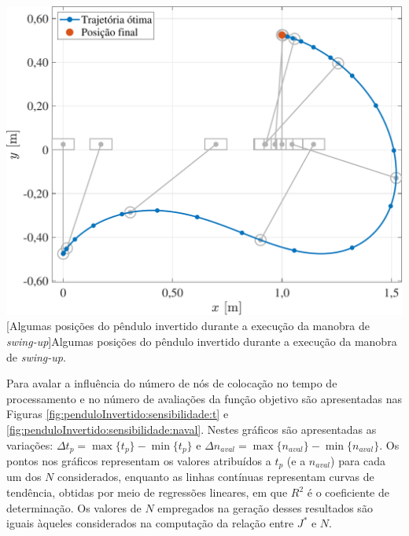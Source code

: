 \noindent
\begin{minipage}{\textwidth}
	\vspace{\onelineskip}
	\centering
	\includegraphics[scale=0.5]{fig/resultados/penduloInvertido/obs/adv}
	[Algumas posições do pêndulo invertido durante a execução da manobra de \textit{swing-up}]{Algumas posições do pêndulo invertido durante a execução da manobra de \textit{swing-up}.}
	\label{fig:penduloInvertido:avancado}
	\vspace{\onelineskip}
\end{minipage}


Para avalar a influência do número de nós de colocação no tempo de processamento e no número de avaliações da função objetivo são apresentadas nas Figuras \ref{fig:penduloInvertido:sensibilidade:t} e \ref{fig:penduloInvertido:sensibilidade:naval}. Nestes gráficos são apresentadas as variações: $ \Delta t_p = \max\{t_p\} - \min\{t_p\} $ e $ \Delta n_{aval} = \max\{n_{aval}\} - \min\{n_{aval}\} $. Os pontos nos gráficos representam os valores atribuídos a $ t_p $ (e a $ n_{aval} $) para cada um dos $ N $ considerados, enquanto as linhas contínuas representam curvas de tendência, obtidas por meio de regressões lineares, em que $R^2$ é o coeficiente de determinação. Os valores de $ N $ empregados na geração desses resultados são iguais àqueles considerados na computação da relação entre $ J^* $ e $ N $.

